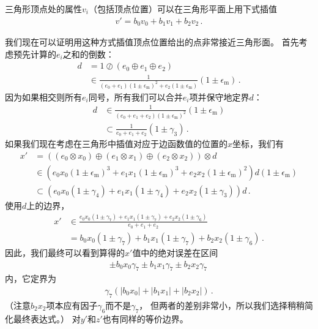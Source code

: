 三角形顶点处的属性$v_i$（包括顶点位置）可以在三角形平面上用下式插值
\begin{align*}
    v'=b_0v_0+b_1v_1+b_2v_2\, .
\end{align*}

我们现在可以证明用这种方式插值顶点位置给出的点非常接近三角形面。
首先考虑预先计算的$e_i$之和的倒数：
\begin{align*}
    d & =1\oslash(e_0\oplus e_1\oplus e_2)                                                                                \\
      & \in\frac{1}{(e_0+e_1)(1\pm\epsilon_{\mathrm{m}})^2+e_2(1\pm\epsilon_{\mathrm{m}})}(1\pm\epsilon_{\mathrm{m}})\, .
\end{align*}
因为如果相交则所有$e_i$同号，所有我们可以合并$e_i$项并保守地定界$d$：
\begin{align*}
    d & \in\frac{1}{(e_0+e_1+e_2)(1\pm\epsilon_{\mathrm{m}})^2}(1\pm\epsilon_{\mathrm{m}}) \\
      & \subset \frac{1}{e_0+e_1+e_2}(1\pm\gamma_3)\, .
\end{align*}
如果我们现在考虑在三角形中插值对应于边函数值的位置的$x$坐标，我们有
\begin{align*}
    x' & =((e_0\otimes x_0)\oplus(e_1\otimes x_1)\oplus(e_2\otimes x_2))\otimes d                                                                     \\
       & \in(e_0x_0(1\pm\epsilon_{\mathrm{m}})^3+e_1x_1(1\pm\epsilon_{\mathrm{m}})^3+e_2x_2(1\pm\epsilon_{\mathrm{m}})^2)d(1\pm\epsilon_{\mathrm{m}}) \\
       & \subset (e_0x_0(1\pm\gamma_4)+e_1x_1(1\pm\gamma_4)+e_2x_2(1\pm\gamma_3))d\, .
\end{align*}
使用$d$上的边界，
\begin{align*}
    x' & \in\frac{e_0x_0(1\pm\gamma_7)+e_1x_1(1\pm\gamma_7)+e_2x_2(1\pm\gamma_6)}{e_0+e_1+e_2} \\
       & =b_0x_0(1\pm\gamma_7)+b_1x_1(1\pm\gamma_7)+b_2x_2(1\pm\gamma_6)\, .
\end{align*}
因此，我们最终可以看到算得的$x'$值中的绝对误差在区间
\begin{align*}
    \pm b_0x_0\gamma_7\pm b_1x_1\gamma_7\pm b_2x_2\gamma_7\,
\end{align*}
内，它定界为
\begin{align}\label{eq:3.15}
    \gamma_7(|b_0x_0|+|b_1x_1|+|b_2x_2|)\, .
\end{align}
（注意$b_2x_2$项本应有因子$\gamma_6$而不是$\gamma_7$，
但两者的差别非常小，所以我们选择稍稍简化最终表达式。）
对$y'$和$z'$也有同样的等价边界。

